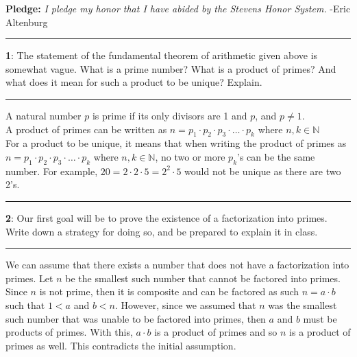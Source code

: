 \documentclass[11pt]{article}
\newcommand\question[2]{\vspace{.25in}\hrule\textbf{#1}: #2\vspace{.5em}\hrule\vspace{.10in}}
\newcommand{\N}{\mathbb{N}}
\begin{document}
\raggedright
\newcommand\NAME{Eric Altenburg}  %
\newcommand\COURSE{MA-240}
\newcommand\HWNUM{13}              %


\textbf{Pledge:} \textit{I pledge my honor that I have abided by the Stevens Honor System.} -Eric Altenburg

\question{1}{The statement of the fundamental theorem of arithmetic given above is somewhat vague. What is a prime number? What is a product of primes? And what does it mean for such a product to be unique? Explain.}

A natural number $p$ is prime if its only divisors are 1 and $p$, and $p \ne 1$.\\
A product of primes can be written as $n = p_1 \cdot p_2 \cdot p_3 \cdot \ldots \cdot p_k$ where $n,k \in \N$\\
For a product to be unique, it means that when writing the product of primes as $n = p_1 \cdot p_2 \cdot p_3 \cdot \ldots \cdot p_k$ where $n,k \in \N$, no two or more $p_k$'s can be the same number. For example, $20 = 2 \cdot 2 \cdot 5 = 2^2 \cdot 5$ would not be unique as there are two 2's.


\question{2}{Our first goal will be to prove the existence of a factorization into primes. Write down a strategy for doing so, and be prepared to explain it in class.}

We can assume that there exists a number that does not have a factorization into primes. Let $n$ be the smallest such number that cannot be factored into primes. Since $n$ is not prime, then it is composite and can be factored as such $n = a \cdot b$ such that $1 < a$ and $b < n$. However, since we assumed that $n$ was the smallest such number that was unable to be factored into primes, then $a$ and $b$ must be products of primes. With this, $a \cdot b$ is a product of primes and so $n$ is a product of primes as well. This contradicts the initial assumption.

\end{document}
